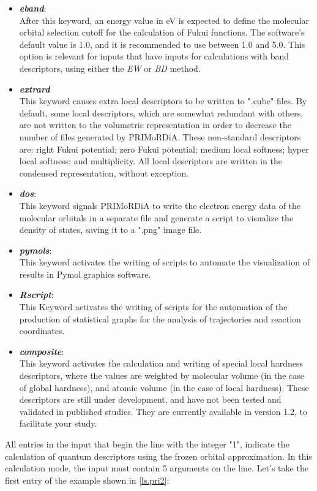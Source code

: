 \documentclass[a4paper,11pt]{refart}
\begin{document}
\begin{itemize}
	\item \emph{\textbf{eband}}: \\
	After this keyword, an energy value in eV is expected to define the molecular orbital selection cutoff for the calculation of Fukui functions. The software's default value is 1.0, and it is recommended to use between 1.0 and 5.0. This option is relevant for inputs that have inputs for calculations with band descriptors, using either the \emph{EW} or \emph{BD} method.	
	\item \emph{\textbf{extrard}}\\
	This keyword causes extra local descriptors to be written to ".cube" files. By default, some local descriptors, which are somewhat redundant with others, are not written to the volumetric representation in order to decrease the number of files generated by PRIMoRDiA. These non-standard descriptors are: right Fukui potential; zero Fukui potential; medium local softness; hyper local softness; and multiplicity. All local descriptors are written in the condensed representation, without exception.	
	\item \emph{\textbf{dos}}:\\
	This keyword signals PRIMoRDiA to write the electron energy data of the molecular orbitals in a separate file and generate a script to visualize the density of states, saving it to a ".png" image file.	
	\item \emph{\textbf{pymols}}:\\
	This keyword activates the writing of scripts to automate the visualization of results in Pymol graphics software.
	\item \emph{\textbf{Rscript}}:\\
	This Keyword activates the writing of scripts for the automation of the production of statistical graphs for the analysis of trajectories and reaction coordinates.
	\item \emph{\textbf{composite}}:\\
	This keyword activates the calculation and writing of special local hardness descriptors, where the values are weighted by molecular volume (in the case of global hardness), and atomic volume (in the case of local hardness). These descriptors are still under development, and have not been tested and validated in published studies. They are currently available in version 1.2, to facilitate your study.
\end{itemize}

All entries in the input that begin the line with the integer "1", indicate the calculation of quantum descriptors using the frozen orbital approximation. In this calculation mode, the input must contain 5 arguments on the line. Let's take the first entry of the example shown in \autoref{ls.pri2}:
\end{document}
